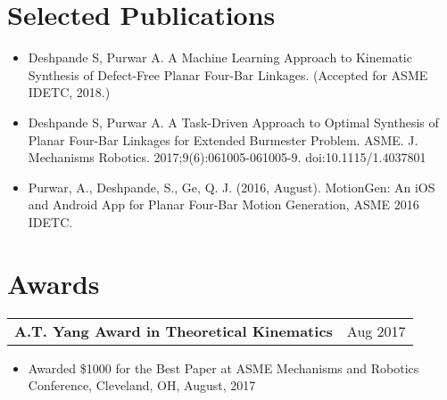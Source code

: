 \documentclass[letterpaper,10pt]{article}
\makeatletter
\newcommand{\resumeHeading}[4]{
  \vspace{-1pt}
    \begin{tabular*}{0.97\textwidth}{l@{\extracolsep{\fill}}r}
      \textbf{#1} & #2 \vspace{-2pt}\\ \vspace{1pt}
      \textit{\small#3} & \textit{\small #4} \\
    \end{tabular*}
}
\newcommand{\resumeSubheadingWithDate}[2]{
    \begin{tabular*}{0.97\textwidth}{l@{\extracolsep{\fill}}r}
      \small\textbf{#1} & \small #2 \\
    \end{tabular*}
    \vspace{+2pt}
}
\newcommand{\resumeSection}[1]{
\vspace{-12pt}
\section{\textbf{#1}}
}
\newcommand{\resumeItemListStart}{
\vspace{-7pt}
\begin{itemize}[leftmargin=14pt]
}
\newcommand{\resumeItemListEnd}{
\vspace{+7pt}
\end{itemize}
}
\newcommand{\resumeItem}[1]{
  \item\small{
      {#1 \vspace{-7pt}
      }
  }
}
\makeatother
\begin{document}


\resumeSection{Selected Publications}
\vspace{+7pt}
    \resumeItemListStart
      \resumeItem{Deshpande S, Purwar A. A Machine Learning Approach to Kinematic Synthesis of Defect-Free Planar Four-Bar Linkages. (Accepted for ASME IDETC, 2018.)}
      \resumeItem{Deshpande S, Purwar A. A Task-Driven Approach to Optimal Synthesis of Planar Four-Bar Linkages for Extended Burmester Problem. ASME. J. Mechanisms Robotics. 2017;9(6):061005-061005-9. doi:10.1115/1.4037801}
      \resumeItem{Purwar, A., Deshpande, S., Ge, Q. J. (2016, August). MotionGen: An iOS and Android App for Planar Four-Bar Motion Generation, ASME 2016 IDETC.}
    \resumeItemListEnd

\resumeSection{Awards}
    \resumeSubheadingWithDate{A.T. Yang Award in Theoretical Kinematics}{Aug 2017}
    \resumeItemListStart
      \resumeItem{Awarded \$1000 for the Best Paper at ASME Mechanisms and Robotics Conference, Cleveland, OH, August, 2017}
    \resumeItemListEnd
\end{document}
